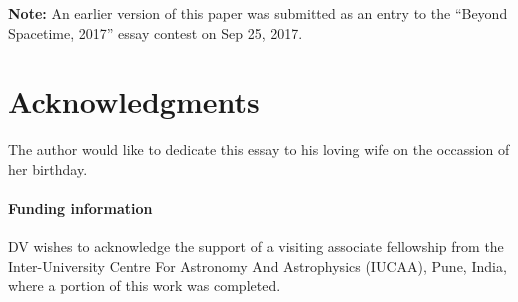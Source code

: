 \documentclass[submission, Phys]{SciPost}
\begin{document}
\textbf{Note:} An earlier version of this paper was submitted as an entry to the ``Beyond Spacetime, 2017'' essay contest on Sep 25, 2017.

\section*{Acknowledgments}

The author would like to dedicate this essay to his loving wife on the occassion of her birthday.

\paragraph{Funding information}

DV wishes to acknowledge the support of a visiting associate fellowship from the Inter-University Centre For Astronomy And Astrophysics (IUCAA), Pune, India, where a portion of this work was completed.

%
%
%
%
\end{document}
